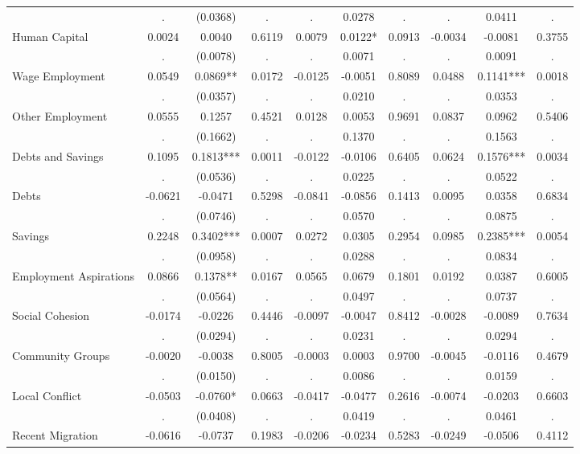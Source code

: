 \begin{tabular}{l*{9}{c}}
  & . & (0.0368) & . & . & 0.0278 & . & . & 0.0411 & . \\
Human Capital & 0.0024 & 0.0040 & 0.6119 & 0.0079 & 0.0122* & 0.0913 & -0.0034 & -0.0081 & 0.3755 \\
  & . & (0.0078) & . & . & 0.0071 & . & . & 0.0091 & . \\
Wage Employment & 0.0549 & 0.0869** & 0.0172 & -0.0125 & -0.0051 & 0.8089 & 0.0488 & 0.1141*** & 0.0018 \\
  & . & (0.0357) & . & . & 0.0210 & . & . & 0.0353 & . \\
Other Employment & 0.0555 & 0.1257 & 0.4521 & 0.0128 & 0.0053 & 0.9691 & 0.0837 & 0.0962 & 0.5406 \\
  & . & (0.1662) & . & . & 0.1370 & . & . & 0.1563 & . \\
Debts and Savings & 0.1095 & 0.1813*** & 0.0011 & -0.0122 & -0.0106 & 0.6405 & 0.0624 & 0.1576*** & 0.0034 \\
  & . & (0.0536) & . & . & 0.0225 & . & . & 0.0522 & . \\
Debts & -0.0621 & -0.0471 & 0.5298 & -0.0841 & -0.0856 & 0.1413 & 0.0095 & 0.0358 & 0.6834 \\
  & . & (0.0746) & . & . & 0.0570 & . & . & 0.0875 & . \\
Savings & 0.2248 & 0.3402*** & 0.0007 & 0.0272 & 0.0305 & 0.2954 & 0.0985 & 0.2385*** & 0.0054 \\
  & . & (0.0958) & . & . & 0.0288 & . & . & 0.0834 & . \\
Employment Aspirations & 0.0866 & 0.1378** & 0.0167 & 0.0565 & 0.0679 & 0.1801 & 0.0192 & 0.0387 & 0.6005 \\
  & . & (0.0564) & . & . & 0.0497 & . & . & 0.0737 & . \\
Social Cohesion & -0.0174 & -0.0226 & 0.4446 & -0.0097 & -0.0047 & 0.8412 & -0.0028 & -0.0089 & 0.7634 \\
  & . & (0.0294) & . & . & 0.0231 & . & . & 0.0294 & . \\
Community Groups & -0.0020 & -0.0038 & 0.8005 & -0.0003 & 0.0003 & 0.9700 & -0.0045 & -0.0116 & 0.4679 \\
  & . & (0.0150) & . & . & 0.0086 & . & . & 0.0159 & . \\
Local Conflict & -0.0503 & -0.0760* & 0.0663 & -0.0417 & -0.0477 & 0.2616 & -0.0074 & -0.0203 & 0.6603 \\
  & . & (0.0408) & . & . & 0.0419 & . & . & 0.0461 & . \\
Recent Migration & -0.0616 & -0.0737 & 0.1983 & -0.0206 & -0.0234 & 0.5283 & -0.0249 & -0.0506 & 0.4112 \\

\end{tabular}
